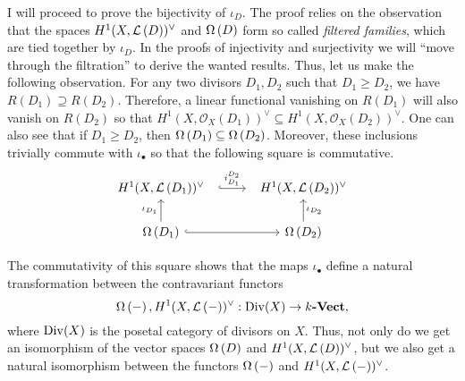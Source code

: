 I will proceed to prove the bijectivity of $\iota_{D}$. The proof relies
on the observation that the spaces $H^1(X,\mathcal{L}\left(D\right))^{\vee}$ and $\Omega\left(D\right)$ form so called
\emph{filtered families}, which are tied together by $\iota_{D}$. In the
proofs of injectivity and surjectivity we will ``move through the
filtration'' to derive the wanted results. Thus, let us make the following
observation. For any two divisors $D_{1}, D_{2}$ such that $D_{1}\geq D_{2}$,
we have $R(D_{1})\supseteq R(D_{2})$. Therefore, a linear functional
vanishing on $R(D_{1})$ will also vanish on $R(D_{2})$ so that
$H^{1}(X,\mathscr{O}_X(D_{1}))^{\vee}\subseteq H^{1}(X,\mathscr{O}_X(D_{2}))^\vee$.
One can also see that if $D_{1}\geq D_{2}$, then $\Omega\left(D_{1}\right)
\subseteq\Omega\left(D_{2}\right)$. Moreover, these inclusions trivially
commute with $\iota_{\bullet}$ so that the following square is commutative.
\begin{equation}\label{eq:iota_square}
  \begin{tikzcd}[column sep=large]
    \dual{D_{1}}\rar[hook, shorten=.7em, "i_{D_{1}}^{D_{2}}"] & \dual{D_{2}} \\
    \diffs{D_{1}}\uar{\iota_{D_{1}}}\rar[hook]
    & \diffs{D_{2}}\uar["\iota_{D_{2}}"']
  \end{tikzcd}
\end{equation}
\begin{cat}
  The commutativity of this square shows that the maps $\iota_{\bullet}$
  define a natural transformation between the contravariant functors
  \[
    \Omega\left(-\right),H^1(X,\mathcal{L}\left(-\right))^{\vee}:\operatorname{Div}(X)\to k\textbf{-Vect},
  \]
  where $\operatorname{Div}(X)$ is the posetal category of divisors on $X$.
  Thus, not only do we get an isomorphism of the vector spaces
  $\Omega\left(D\right)$ and $H^1(X,\mathcal{L}\left(D\right))^{\vee}$, but we also get a natural isomorphism
  between the functors $\Omega\left(-\right)$ and $H^1(X,\mathcal{L}\left(-\right))^{\vee}$.
\end{cat}


